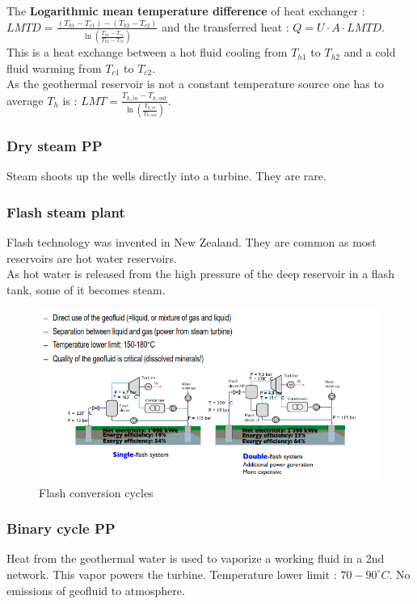 \documentclass[../main.tex]{subfiles}
\begin{document}
The \textbf{Logarithmic mean temperature difference} of heat exchanger : $LMTD = \frac{(T_{h1}-T_{c1})- (T_{h2}-T_{c2})}{\ln(\frac{T_{h1}-T_{c1}}{T_{h2}-T_{c2}})}$ and the transferred heat : $Q = U\cdot A \cdot LMTD$.\\
This is a heat exchange between a hot fluid cooling from $T_{h1}$ to $T_{h2}$ and a cold fluid warming from $T_{c1}$ to $T_{c2}$.\\

As the geothermal reservoir is not a constant temperature source one has to average $T_h$ is : $LMT = \frac{T_{h,in}-T_{h,out}}{\ln(\frac{T_{h,in}}{T_{h,out}})}$.\\

\subsubsection{Dry steam PP}
Steam shoots up the wells directly into a turbine. They are rare.\\

\subsubsection{Flash steam plant}
Flash technology was invented in New Zealand. They are common as most reservoirs are hot water reservoirs. \\
As hot water is released from the high pressure of the deep reservoir in a flash tank, some of it becomes steam. \\

\begin{figure}[hbt!]
    \centering
    \includegraphics[width=0.5\linewidth]{IMAGES/Renewable/Screenshot from 2025-03-04 22-23-41.png}
    \caption{Flash conversion cycles}
\end{figure}

\subsubsection{Binary cycle PP}
Heat from the geothermal water is used to vaporize a working fluid in a 2nd network. This vapor powers the turbine. Temperature lower limit : $70-90^\circ C$. No emissions of geofluid to atmosphere. \\
\end{document}
